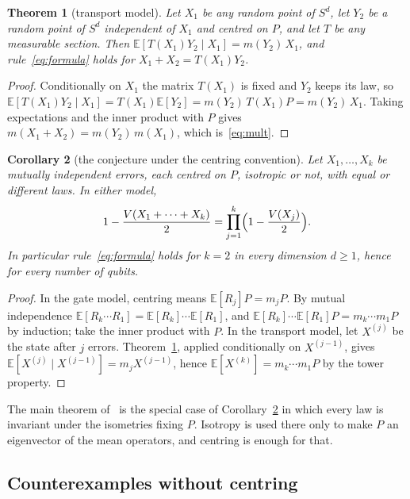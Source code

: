 \documentclass[11pt,a4paper]{article}
\newtheorem{theorem}{Theorem}
\newtheorem{corollary}[theorem]{Corollary}
\theoremstyle{definition}
\theoremstyle{plain}
\newcommand{\E}{\mathbb{E}}
\begin{document}
\begin{theorem}[transport model]\label{thm:transport}
Let $X_1$ be any random point of $S^d$, let $Y_2$ be a random point of $S^d$
independent of $X_1$ and centred on $P$, and let $T$ be any measurable
section. Then $\E[T(X_1)Y_2\mid X_1]=m(Y_2)\,X_1$, and rule~\eqref{eq:formula}
holds for $X_1+X_2=T(X_1)Y_2$.
\end{theorem}

\begin{proof}
Conditionally on $X_1$ the matrix $T(X_1)$ is fixed and $Y_2$ keeps its law,
so $\E[T(X_1)Y_2\mid X_1]=T(X_1)\E[Y_2]=m(Y_2)\,T(X_1)P=m(Y_2)\,X_1$. Taking
expectations and the inner product with $P$ gives
$m(X_1+X_2)=m(Y_2)\,m(X_1)$, which is~\eqref{eq:mult}.
\end{proof}

\begin{corollary}[the conjecture under the centring convention]\label{cor:k}
Let $X_1,\dots,X_k$ be mutually independent errors, each centred on $P$,
isotropic or not, with equal or different laws. In either model,
\[
1-\frac{V(X_1+\dots+X_k)}{2}=\prod_{j=1}^{k}\Bigl(1-\frac{V(X_j)}{2}\Bigr).
\]
In particular rule~\eqref{eq:formula} holds for $k=2$ in every dimension
$d\ge1$, hence for every number of qubits.
\end{corollary}

\begin{proof}
In the gate model, centring means $\E[R_j]P=m_jP$. By mutual independence
$\E[R_k\cdots R_1]=\E[R_k]\cdots\E[R_1]$, and
$\E[R_k]\cdots\E[R_1]P=m_k\cdots m_1P$ by induction; take the inner product
with $P$. In the transport model, let $X^{(j)}$ be the state after $j$
errors. Theorem~\ref{thm:transport}, applied conditionally on $X^{(j-1)}$,
gives $\E[X^{(j)}\mid X^{(j-1)}]=m_jX^{(j-1)}$, hence
$\E[X^{(k)}]=m_k\cdots m_1P$ by the tower property.
\end{proof}

The main theorem of~\cite{LacallePozo2019} is the special case of
Corollary~\ref{cor:k} in which every law is invariant under the isometries
fixing $P$. Isotropy is used there only to make $P$ an eigenvector of the
mean operators, and centring is enough for that.

\subsection{Counterexamples without centring}
\end{document}
